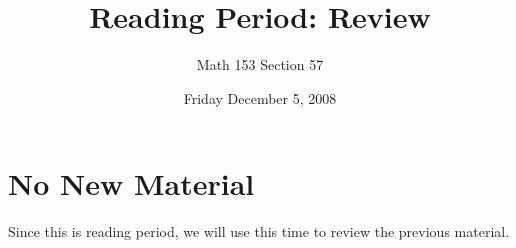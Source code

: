 \documentclass[12pt]{article}
\title{Reading Period: Review}
\author{Math 153 Section 57}
\date{Friday December  5, 2008}
\begin{document}
\maketitle

\section{No New Material}

Since this is reading period, we will use this time to review the
previous material.
\end{document}
